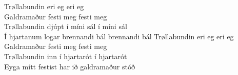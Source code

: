 
Trøllabundin eri eg eri eg\\
Galdramaður festi meg festi meg\\
Trøllabundin djúpt í míni sál í míni sál\\
Í hjartanum logar brennandi bál brennandi bál
\hops
Trøllabundin eri eg eri eg\\
Galdramaður festi meg festi meg\\
Trøllabundin inn í hjartarót í hjartarót\\
Eyga mítt festist har ið galdramaður stóð